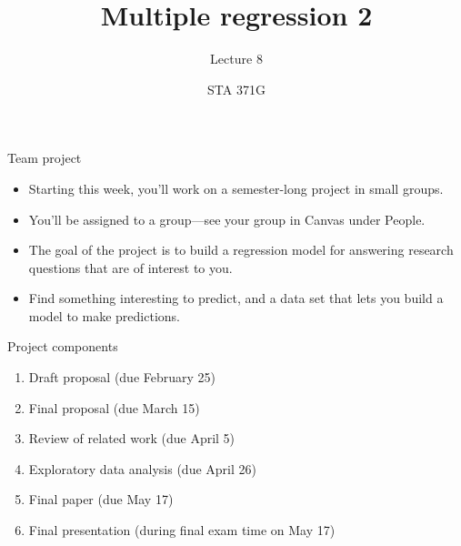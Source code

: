 \documentclass{beamer}\usepackage[]{graphicx}\usepackage[]{color}
\title{Multiple regression 2}
\subtitle{Lecture 8}
\author{STA 371G}
\begin{document}
  
  

  \frame{\maketitle}



  \begin{darkframes}
    \begin{frame}{Team project}
      \begin{itemize}[<+->]
        \item Starting this week, you'll work on a semester-long project in small groups.
        \item You'll be assigned to a group---see your group in Canvas under People.
        \item The goal of the project is to build a regression model for answering research questions that are of interest to you.
        \item Find something interesting to predict, and a data set that lets you build a model to make predictions.
      \end{itemize}
    \end{frame}

    \begin{frame}{Project components}
      \begin{enumerate}
        \item Draft proposal (due February 25)
        \item Final proposal (due March 15)
        \item Review of related work (due April 5)
        \item Exploratory data analysis (due April 26)
        \item Final paper (due May 17)
        \item Final presentation (during final exam time on May 17)
      \end{enumerate}
    \end{frame}


\end{darkframes}
\end{document}
